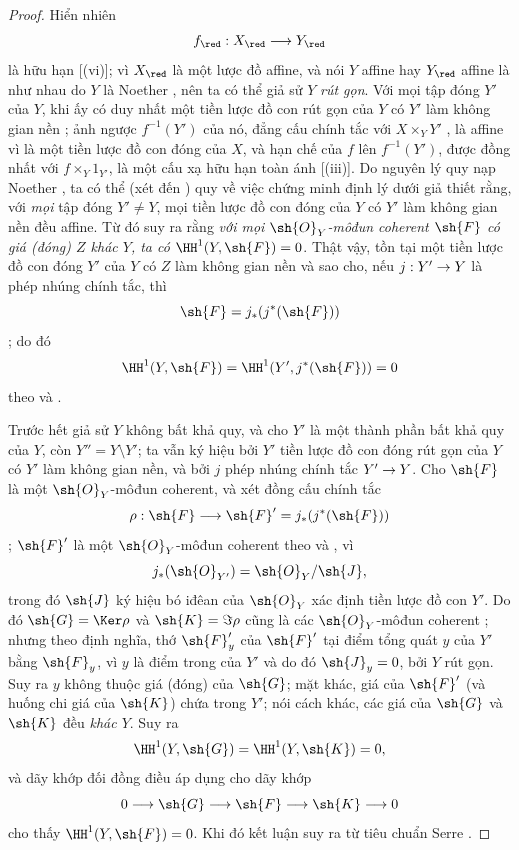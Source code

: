 \documentclass[oneside,10pt]{amsart}
\makeatletter
\newcommand{\ega@arrow}[2]{\mathchoice{#1}{#2}{#2}{#2}}
\renewcommand{\to}{\ega@arrow{\longrightarrow}{\rightarrow}}
\makeatother
\begin{document}
\begin{proof}
Hiển nhiên
\[
  f_\red:X_\red\to Y_\red
\]
là hữu hạn [(vi)];
vì $X_\red$ là một lược đồ affine, và nói $Y$ affine hay $Y_\red$ affine là như nhau do $Y$ là Noether , nên ta có thể giả sử $Y$ \emph{rút gọn}.
Với mọi tập đóng $Y'$ của $Y$, khi ấy có duy nhất một tiền lược đồ con rút gọn của $Y$ có $Y'$ làm không gian nền ;
ảnh ngược $f^{-1}(Y')$ của nó, đẳng cấu chính tắc với $X\times_Y Y'$ , là affine vì là một tiền lược đồ con đóng của $X$, và hạn chế của $f$ lên $f^{-1}(Y')$, được đồng nhất với $f\times_Y1_{Y'}$, là một cấu xạ hữu hạn toàn ánh [(iii)].
Do nguyên lý quy nạp Noether , ta có thể (xét đến ) quy về việc chứng minh định lý dưới giả thiết rằng, với \emph{mọi} tập đóng $Y'\neq Y$, mọi tiền lược đồ con đóng của $Y$ có $Y'$ làm không gian nền đều affine.
Từ đó suy ra rằng \emph{với mọi $\sh{O}_Y$-môđun coherent $\sh{F}$ có giá (đóng) $Z$ khác $Y$, ta có $\HH^1(Y,\sh{F})=0$}.
Thật vậy, tồn tại một tiền lược đồ con đóng $Y'$ của $Y$ có $Z$ làm không gian nền và sao cho, nếu $j:Y'\to Y$ là phép nhúng chính tắc, thì
\[
  \sh{F}=j_*(j^*(\sh{F}))
\]
;
do đó
\[
  \HH^1(Y,\sh{F})=\HH^1(Y',j^*(\sh{F}))=0
\]
theo  và .

Trước hết giả sử $Y$ không bất khả quy, và cho $Y'$ là một thành phần bất khả quy của $Y$, còn $Y''=Y\setminus Y'$;
ta vẫn ký hiệu bởi $Y'$ tiền lược đồ con đóng rút gọn của $Y$ có $Y'$ làm không gian nền, và bởi $j$ phép nhúng chính tắc $Y'\to Y$.
Cho $\sh{F}$ là một $\sh{O}_Y$-môđun coherent, và xét đồng cấu chính tắc
\[
  \rho:\sh{F}\to\sh{F}'=j_*(j^*(\sh{F}))
\]
;
$\sh{F}'$ là một $\sh{O}_Y$-môđun coherent theo  và , vì
\[
  j_*(\sh{O}_{Y'})=\sh{O}_Y/\sh{J},
\]
trong đó $\sh{J}$ ký hiệu bó iđêan của $\sh{O}_Y$ xác định tiền lược đồ con $Y'$.
Do đó $\sh{G}=\Ker\rho$ và $\sh{K}=\Im\rho$ cũng là các $\sh{O}_Y$-môđun coherent ;
nhưng theo định nghĩa, thớ $\sh{F}'_y$ của $\sh{F}'$ tại điểm tổng quát $y$ của $Y'$ bằng $\sh{F}_y$, vì $y$ là điểm trong của $Y'$ và do đó $\sh{J}_y=0$, bởi $Y$ rút gọn.
Suy ra $y$ không thuộc giá (đóng) của $\sh{G}$;
mặt khác, giá của $\sh{F}'$ (và huống chi giá của $\sh{K}$) chứa trong $Y'$;
nói cách khác, các giá của $\sh{G}$ và $\sh{K}$ đều \emph{khác $Y$}.
Suy ra
\[
  \HH^1(Y,\sh{G})=\HH^1(Y,\sh{K})=0,
\]
và dãy khớp đối đồng điều áp dụng cho dãy khớp
\[
  0\to\sh{G}\to\sh{F}\to\sh{K}\to0
\]
cho thấy $\HH^1(Y,\sh{F})=0$.
Khi đó kết luận suy ra từ tiêu chuẩn Serre .


\end{proof}
\end{document}
